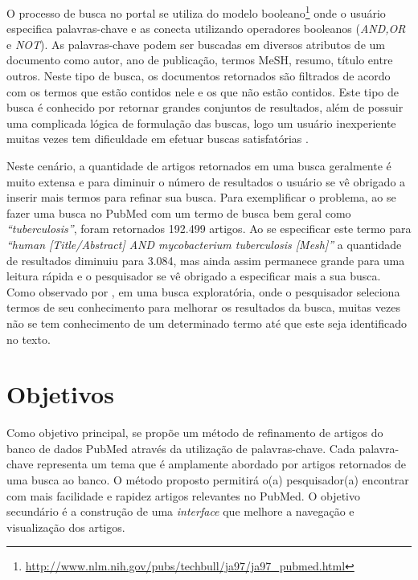 O processo de busca no portal se utiliza do modelo booleano\footnote{\href{http://www.nlm.nih.gov/pubs/techbull/ja97/ja97\_pubmed.html}{http://www.nlm.nih.gov/pubs/techbull/ja97/ja97\_pubmed.html}} onde o usuário especifica palavras-chave e as conecta utilizando operadores booleanos (\emph{AND,OR} e \emph{NOT}). As palavras-chave podem ser buscadas em diversos atributos de um documento como autor, ano de publicação, termos MeSH, resumo, título entre outros. Neste tipo de busca, os documentos retornados são filtrados de acordo com os termos que estão contidos nele e os que não estão contidos. Este tipo de busca é conhecido por retornar grandes conjuntos de resultados, além de possuir uma complicada lógica de formulação das buscas, logo um usuário inexperiente muitas vezes tem dificuldade em efetuar buscas satisfatórias \cite{Jackson2007}. 

Neste cenário, a quantidade de artigos retornados em uma busca geralmente é muito extensa e para diminuir o número de resultados o usuário se vê obrigado a inserir mais termos para refinar sua busca. Para exemplificar o problema, ao se fazer uma busca no PubMed com um termo de busca bem geral como \emph{“tuberculosis”}, foram retornados 192.499 artigos. Ao se especificar este termo para \emph{“human [Title/Abstract] AND mycobacterium tuberculosis [Mesh]”} a quantidade de resultados diminuiu para 3.084, mas ainda assim permanece grande para uma leitura rápida e o pesquisador se vê obrigado a especificar mais a sua busca. Como observado por \cite{Perez-Iratxeta2001}, em uma busca exploratória, onde o pesquisador seleciona termos de seu conhecimento para melhorar os resultados da busca, muitas vezes não se tem conhecimento de um determinado termo até que este seja identificado no texto.

\section{Objetivos}
Como objetivo principal, se propõe um método de refinamento de artigos do banco de dados PubMed através da utilização de palavras-chave. Cada palavra-chave representa um tema que é amplamente abordado por artigos retornados de uma busca ao banco. O método proposto permitirá o(a) pesquisador(a) encontrar com mais facilidade e rapidez artigos relevantes no PubMed. O objetivo secundário é a construção de uma \emph{interface} que melhore a navegação e visualização dos artigos.

